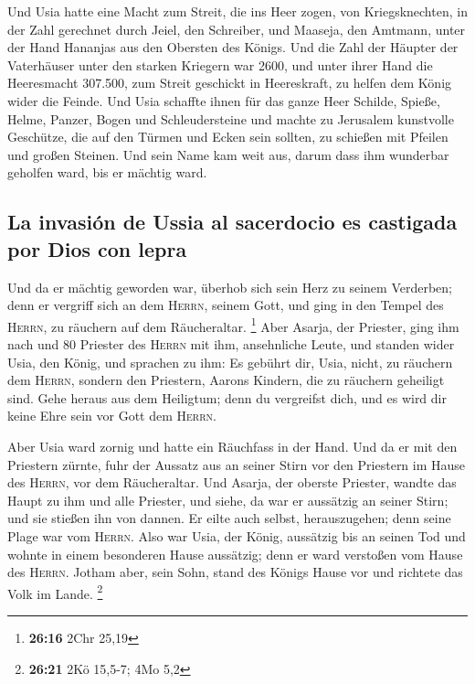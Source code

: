 Und Usia hatte eine Macht zum Streit, die ins Heer
zogen, von Kriegsknechten, in der Zahl gerechnet durch Jeiel, den
Schreiber, und Maaseja, den Amtmann, unter der Hand Hananjas aus den
Obersten des Königs.  Und die Zahl der Häupter der
Vaterhäuser unter den starken Kriegern war 2600,  und
unter ihrer Hand die Heeresmacht 307.500, zum Streit geschickt in
Heereskraft, zu helfen dem König wider die Feinde.  Und
Usia schaffte ihnen für das ganze Heer Schilde, Spieße, Helme, Panzer,
Bogen und Schleudersteine  und machte zu Jerusalem
kunstvolle Geschütze, die auf den Türmen und Ecken sein sollten, zu
schießen mit Pfeilen und großen Steinen. Und sein Name kam weit aus,
darum dass ihm wunderbar geholfen ward, bis er mächtig ward.

\hypertarget{la-invasiuxf3n-de-ussia-al-sacerdocio-es-castigada-por-dios-con-lepra}{%
\subsection{La invasión de Ussia al sacerdocio es castigada por Dios con
lepra}\label{la-invasiuxf3n-de-ussia-al-sacerdocio-es-castigada-por-dios-con-lepra}}

 Und da er mächtig geworden war, überhob sich sein Herz
zu seinem Verderben; denn er vergriff sich an dem \textsc{Herrn}, seinem
Gott, und ging in den Tempel des \textsc{Herrn}, zu räuchern auf dem
Räucheraltar. \footnote{\textbf{26:16} 2Chr 25,19}  Aber
Asarja, der Priester, ging ihm nach und 80 Priester des \textsc{Herrn}
mit ihm, ansehnliche Leute,  und standen wider Usia, den
König, und sprachen zu ihm: Es gebührt dir, Usia, nicht, zu räuchern dem
\textsc{Herrn}, sondern den Priestern, Aarons Kindern, die zu räuchern
geheiligt sind. Gehe heraus aus dem Heiligtum; denn du vergreifst dich,
und es wird dir keine Ehre sein vor Gott dem \textsc{Herrn}.

 Aber Usia ward zornig und hatte ein Räuchfass in der
Hand. Und da er mit den Priestern zürnte, fuhr der Aussatz aus an seiner
Stirn vor den Priestern im Hause des \textsc{Herrn}, vor dem
Räucheraltar.  Und Asarja, der oberste Priester, wandte
das Haupt zu ihm und alle Priester, und siehe, da war er aussätzig an
seiner Stirn; und sie stießen ihn von dannen. Er eilte auch selbst,
herauszugehen; denn seine Plage war vom \textsc{Herrn}. 
Also war Usia, der König, aussätzig bis an seinen Tod und wohnte in
einem besonderen Hause aussätzig; denn er ward verstoßen vom Hause des
\textsc{Herrn}. Jotham aber, sein Sohn, stand des Königs Hause vor und
richtete das Volk im Lande. \footnote{\textbf{26:21} 2Kö 15,5-7; 4Mo 5,2}

